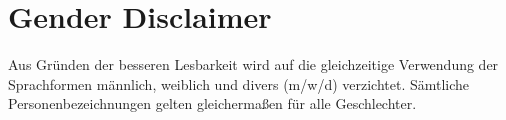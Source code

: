 \chapter*{Gender Disclaimer} %
\label{cha:Gender Disclaimer}

Aus Gründen der besseren Lesbarkeit wird auf die gleichzeitige Verwendung der Sprachformen männlich, weiblich und divers (m/w/d) verzichtet. Sämtliche Personenbezeichnungen gelten gleichermaßen für alle Geschlechter.

